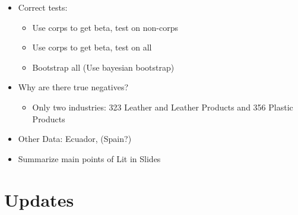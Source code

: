 \documentclass[
  12pt]{article}
\providecommand{\tightlist}{%
  \setlength{\itemsep}{0pt}\setlength{\parskip}{0pt}}\usepackage{longtable,booktabs,array}
\theoremstyle{definition}
\theoremstyle{remark}
\begin{document}
\begin{itemize}
\tightlist
\item
  Correct tests:

  \begin{itemize}
  \tightlist
  \item
    Use corps to get beta, test on non-corps
  \item
    Use corps to get beta, test on all
  \item
    Bootstrap all (Use bayesian bootstrap)
  \end{itemize}
\item
  Why are there true negatives?

  \begin{itemize}
  \tightlist
  \item
    Only two industries: 323 Leather and Leather Products and 356
    Plastic Products
  \end{itemize}
\item
  Other Data: Ecuador, (Spain?)
\item
  Summarize main points of Lit in Slides
\end{itemize}

\section*{Updates}\label{updates}
\end{document}
